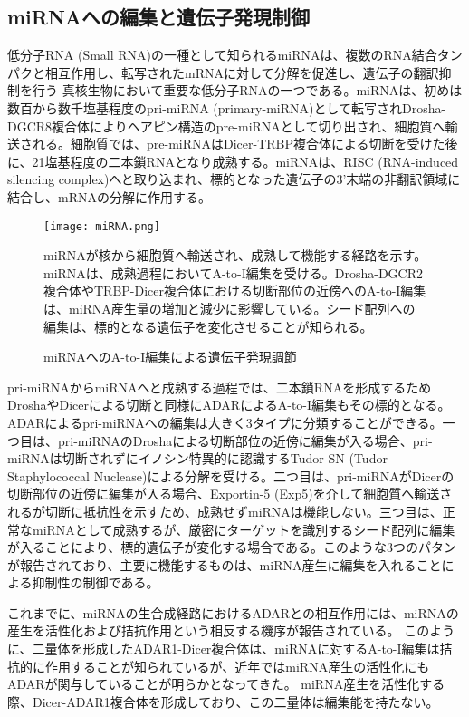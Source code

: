 \subsection{miRNAへの編集と遺伝子発現制御}
低分子RNA (Small RNA)の一種として知られるmiRNAは、複数のRNA結合タンパクと相互作用し、転写されたmRNAに対して分解を促進し、遺伝子の翻訳抑制を行う
真核生物において重要な低分子RNAの一つである。miRNAは、初めは数百から数千塩基程度のpri-miRNA (primary-miRNA)として転写されDrosha-DGCR8複合体によりヘアピン構造のpre-miRNAとして切り出され、細胞質へ輸送される。細胞質では、pre-miRNAはDicer-TRBP複合体による切断を受けた後に、21塩基程度の二本鎖RNAとなり成熟する。miRNAは、RISC (RNA-induced silencing complex)へと取り込まれ、標的となった遺伝子の3'末端の非翻訳領域に結合し、mRNAの分解に作用する。

\begin{figure}[!h]
	\begin{center}
		\texttt{[image: miRNA.png]}
	\end{center}
	\caption{miRNAへのA-to-I編集による遺伝子発現調節}
	\begin{flushleft}
		\small{miRNAが核から細胞質へ輸送され、成熟して機能する経路を示す。miRNAは、成熟過程においてA-to-I編集を受ける。Drosha-DGCR2複合体やTRBP-Dicer複合体における切断部位の近傍へのA-to-I編集は、miRNA産生量の増加と減少に影響している。シード配列への編集は、標的となる遺伝子を変化させることが知られる。}
	\end{flushleft}
	\label{fig:miRNA}
\end{figure}
pri-miRNAからmiRNAへと成熟する過程では、二本鎖RNAを形成するためDroshaやDicerによる切断と同様にADARによるA-to-I編集もその標的となる。ADARによるpri-miRNAへの編集は大きく3タイプに分類することができる。一つ目は、pri-miRNAのDroshaによる切断部位の近傍に編集が入る場合、pri-miRNAは切断されずにイノシン特異的に認識するTudor-SN (Tudor Staphylococcal
Nuclease)による分解を受ける。二つ目は、pri-miRNAがDicerの切断部位の近傍に編集が入る場合、Exportin-5 (Exp5)を介して細胞質へ輸送されるが切断に抵抗性を示すため、成熟せずmiRNAは機能しない。三つ目は、正常なmiRNAとして成熟するが、厳密にターゲットを識別するシード配列に編集が入ることにより、標的遺伝子が変化する場合である。このような3つのパタンが報告されており、主要に機能するものは、miRNA産生に編集を入れることによる抑制性の制御である。
\par
これまでに、miRNAの生合成経路におけるADARとの相互作用には、miRNAの産生を活性化および拮抗作用という相反する機序が報告されている。
このように、二量体を形成したADAR1-Dicer複合体は、miRNAに対するA-to-I編集は拮抗的に作用することが知られているが、近年ではmiRNA産生の活性化にもADARが関与していることが明らかとなってきた。
miRNA産生を活性化する際、Dicer-ADAR1複合体を形成しており、この二量体は編集能を持たない。

